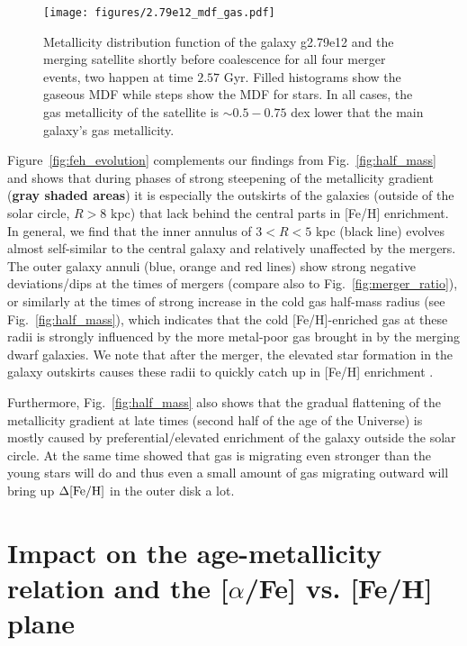 \documentclass[useAMS,usenatbib]{mnras}
\begin{document}
\begin{figure*}
    \begin{centering}
        \texttt{[image: figures/2.79e12\_mdf\_gas.pdf]}
        \vspace*{-1.75em}
        \caption{
            Metallicity distribution function of the galaxy g2.79e12 and the merging satellite shortly before coalescence for all four merger events, two happen at time $2.57$ Gyr. Filled histograms show the gaseous MDF while steps show the MDF for stars. In all cases, the gas metallicity of the satellite is $\sim0.5-0.75$ dex lower that the main galaxy's gas metallicity.
        }
        \label{fig:mdf}
    \end{centering}
\end{figure*}

Figure~\ref{fig:feh_evolution} complements our findings from Fig.~\ref{fig:half_mass} and shows that during phases of strong steepening of the metallicity gradient (\textbf{gray shaded areas}) it is especially the outskirts of the galaxies (outside of the solar circle, $R>8$ kpc) that lack behind the central parts in [Fe/H] enrichment. In general, we find that the inner annulus of $3<R<5$ kpc (black line) evolves almost self-similar to the central galaxy and relatively unaffected by the mergers. The outer galaxy annuli (blue, orange and red lines) show strong negative deviations/dips at the times of mergers (compare also to Fig.~\ref{fig:merger_ratio}), or similarly at the times of strong increase in the cold gas half-mass radius (see Fig.~\ref{fig:half_mass}), which indicates that the cold [Fe/H]-enriched gas at these radii is strongly influenced by the more metal-poor gas brought in by the merging dwarf galaxies. We note that after the merger, the elevated star formation in the galaxy outskirts causes these radii to quickly catch up in [Fe/H] enrichment \citep[see also Fig. 7 in][]{Buck2020}.

Furthermore, Fig.~\ref{fig:half_mass} also shows that the gradual flattening of the metallicity gradient at late times (second half of the age of the Universe) is mostly caused by preferential/elevated enrichment of the galaxy outside the solar circle. At the same time \cite{Minchev2012a} showed that gas is migrating even stronger than the young stars will do and thus even a small amount of gas migrating outward will bring up $\Delta\rm{[Fe/H]}$ in the outer disk a lot.


\section{Impact on the age-metallicity relation and the [$\alpha$/Fe] vs. [Fe/H] plane} \label{sec:results-age}
\end{document}
